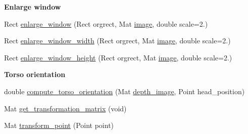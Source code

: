 \begin{Indent}{\bf Enlarge window}\par
\begin{DoxyCompactItemize}
\item 
Rect \hyperlink{classCvUtils_a349894b926e2d252d0ce224abcba698a}{enlarge\-\_\-window} (Rect orgrect, Mat \hyperlink{create__ground__truth_8cpp_aabb27b8973575043030df51be47cd24a}{image}, double scale=2.)
\item 
Rect \hyperlink{classCvUtils_afa759cc435e69dabe1b498215a9d9967}{enlarge\-\_\-window\-\_\-width} (Rect orgrect, Mat \hyperlink{create__ground__truth_8cpp_aabb27b8973575043030df51be47cd24a}{image}, double scale=2.)
\item 
Rect \hyperlink{classCvUtils_ae3f32bfe57a7fea941e61f8beb146637}{enlarge\-\_\-window\-\_\-height} (Rect orgrect, Mat \hyperlink{create__ground__truth_8cpp_aabb27b8973575043030df51be47cd24a}{image}, double scale=2.)
\end{DoxyCompactItemize}
\end{Indent}
\begin{Indent}{\bf Torso orientation}\par
\begin{DoxyCompactItemize}
\item 
double \hyperlink{classCvUtils_a90574948cfab1863cad26a2b8a43c37f}{compute\-\_\-torso\-\_\-orientation} (Mat \hyperlink{social__robot__onethread_8cpp_a5b613972ff73fd7b34e0ee18acc5c1a6}{depth\-\_\-image}, Point head\-\_\-position)
\item 
Mat \hyperlink{classCvUtils_a3e96de4f2f4e2c74eb18e9ad658d1575}{get\-\_\-transformation\-\_\-matrix} (void)
\item 
Mat \hyperlink{classCvUtils_ad8b10d8ef42dc7437bcb40c13dd23d33}{transform\-\_\-point} (Point point)
\end{DoxyCompactItemize}
\end{Indent}
